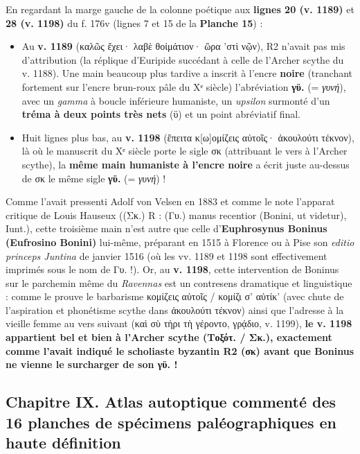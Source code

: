 \documentclass[11pt, a4paper, twoside]{article}
\renewcommand{\_}{\origunderscore\penalty0\relax}
\renewcommand{\texttt}[1]{#1}
\newcommand{\Rdeux}{\textbf{R}\textsuperscript{2}}
\newcommand{\inRas}[2]{[\kern-0.15em[#1]\kern-0.15em]#2}
\def\Rdeux{R2}%
\def\inRas#1#2{[#1]#2}%
\begin{document}
En regardant la marge gauche de la colonne poétique aux \textbf{lignes 20 (v. 1189)} et \textbf{28 (v. 1198)} du \texttt{f. 176v} (lignes 7 et 15 de la \textbf{Planche 15}) :
\begin{itemize}[leftmargin=1.5em, itemsep=2pt]
  \item Au \textbf{v. 1189} (\texttt{καλῶς ἔχει· λαβὲ θοἰμάτιον· ὥρα 'στὶ νῷν}), \Rdeux{} n'avait pas mis d'attribution (la réplique d'Euripide succédant à celle de l'Archer scythe du v. 1188). Une main beaucoup plus tardive a inscrit à l'encre \textbf{noire} (tranchant fortement sur l'encre brun-roux pâle du Xᵉ siècle) l'abréviation \textbf{\texttt{γϋ.}} (= \textit{γυνή}), avec un \textit{gamma} à boucle inférieure humaniste, un \textit{upsilon} surmonté d'un \textbf{tréma à deux points très nets} (\texttt{ϋ}) et un point abréviatif final.
  \item Huit lignes plus bas, au \textbf{v. 1198} (\texttt{ἔπειτα κ\inRas{ω}{ο}μίζεις αὐτοῖς· ἀκουλούτι τέκνον}), là où le manuscrit du Xᵉ siècle porte le sigle \texttt{σκ} (attribuant le vers à l'Archer scythe), la \textbf{même main humaniste à l'encre noire} a écrit juste au-dessus de \texttt{σκ} le même sigle \textbf{\texttt{γϋ.}} (= \textit{γυνή}) !
\end{itemize}

Comme l'avait pressenti Adolf von Velsen en 1883 et comme le note l'apparat critique de Louis Hauseux (\texttt{(Σκ.) R : (Γυ.) manus recentior (Bonini, ut videtur), Iunt.}), cette troisième main n'est autre que celle d'\textbf{Euphrosynus Boninus (Eufrosino Bonini)} lui-même, préparant en 1515 à Florence ou à Pise son \textit{editio princeps Juntina} de janvier 1516 (où les vv. 1189 et 1198 sont effectivement imprimés sous le nom de \texttt{Γυ.} !).
Or, au \textbf{v. 1198}, cette intervention de Boninus sur le parchemin même du \textit{Ravennas} est un contresens dramatique et linguistique : comme le prouve le barbarisme \texttt{κομίζεις αὐτοῖς} / \texttt{κομίζι σ' αὐτίκ'} (avec chute de l'aspiration et phonétisme scythe dans \texttt{ἀκουλούτι τέκνον}) ainsi que l'adresse à la vieille femme au vers suivant (\texttt{καὶ σὺ τήρι τὴ γέροντο, γρᾴδιο}, v. 1199), \textbf{le v. 1198 appartient bel et bien à l'Archer scythe (\texttt{Τοξότ.} / \texttt{Σκ.}), exactement comme l'avait indiqué le scholiaste byzantin \Rdeux{} (\texttt{σκ}) avant que Boninus ne vienne le surcharger de son \texttt{γϋ.} !}



\newpage
\subsection{Chapitre IX. Atlas autoptique commenté des 16 planches de spécimens paléographiques en haute définition}
\end{document}
